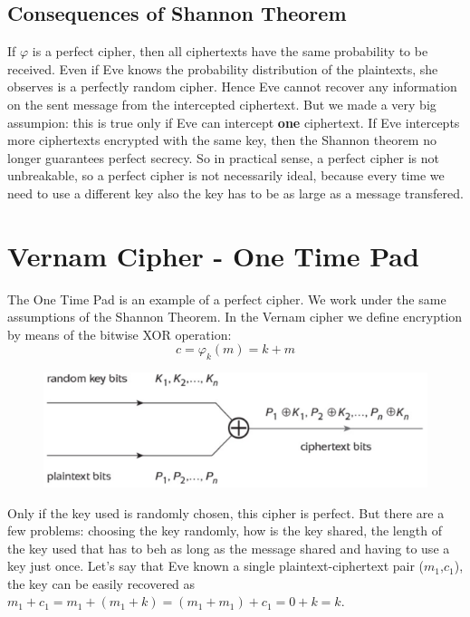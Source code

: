 	\subsection{Consequences of Shannon Theorem}
	
	If $\varphi$ is a perfect cipher, then all ciphertexts have the same probability to be received. Even if Eve knows the probability distribution of the plaintexts, she observes is a perfectly random cipher. Hence Eve cannot recover any information on the sent message from the intercepted ciphertext. But we made a very big assumpion: this is true only if Eve can intercept \textbf{one} ciphertext. If Eve intercepts more ciphertexts encrypted with the same key, then the Shannon theorem no longer guarantees perfect secrecy. So in practical sense, a perfect cipher is not unbreakable, so a perfect cipher is not necessarily ideal, because every time we need to use a different key also the key has to be as large as a message transfered.

\section{Vernam Cipher - One Time Pad}

The One Time Pad is an example of a perfect cipher. We work under the same assumptions of the Shannon Theorem. In the Vernam cipher we define encryption by means of the bitwise XOR operation:
$$c = \varphi_k (m) = k + m$$

\begin{figure}
	\centering
	\includegraphics[width=0.7\linewidth]{Images/Chapter1/screenshot004}
	\caption{}
	\label{fig:chapter1_screenshot004}
\end{figure}

Only if the key used is randomly chosen, this cipher is perfect.
But there are a few problems: choosing the key randomly, how is the key shared, the length of the key used that has to beh as long as the message shared and having to use a key just once. Let's say that Eve known a single plaintext-ciphertext pair ($m_1$,$c_1$), the key can be easily recovered as $m_1+c_1=m_1+(m_1+k)=(m_1+m_1)+c_1=0+k=k$.

